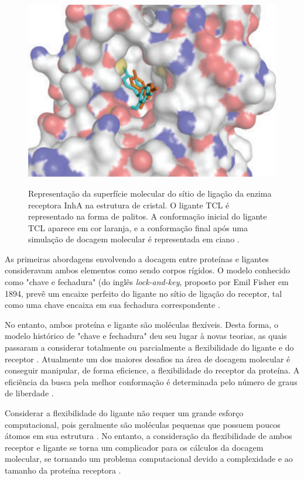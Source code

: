 \begin{figure}[h]
	\center
	\includegraphics[width=14cm]{images/TCLdocking.png}
	\label{fig:TCLdocking}
	\caption{Representação da superfície molecular do sítio de ligação da enzima receptora InhA na estrutura de cristal. O ligante TCL é  representado na forma de palitos. A conformação inicial do ligante TCL aparece em cor laranja, e a conformação final após uma simulação de docagem molecular é representada em ciano \cite{REN13}.}
\end{figure}

As primeiras abordagens envolvendo a docagem entre proteínas e ligantes consideravam ambos elementos como sendo corpos rígidos. O modelo conhecido como "chave e fechadura" (do inglês \emph{lock-and-key}, proposto por Emil Fisher em 1894, prevê um encaixe perfeito do ligante no sítio de ligação do receptor, tal como uma chave encaixa em sua fechadura correspondente \cite{kar07}. 

No entanto, ambos proteína e ligante são moléculas flexíveis. Desta forma, o modelo histórico de "chave e fechadura" deu seu lugar à novas teorias, as quais passaram a considerar totalmente ou parcialmente a flexibilidade do ligante e do receptor \cite{SOU06}. Atualmente um dos maiores desafios na área de docagem molecular é conseguir manipular, de forma eficience, a flexibilidade do receptor da proteína. A eficiência da busca pela melhor conformação é determinada pelo número de graus de liberdade  \cite{SOU06}. 

Considerar a flexibilidade do ligante não requer um grande esforço computacional, pois geralmente são moléculas pequenas que possuem poucos átomos em sua estrutura \cite{COH10}. No entanto, a consideração da flexibilidade de ambos receptor e ligante se torna um complicador para os cálculos da docagem molecular, se tornando um problema computacional devido a complexidade e ao tamanho da proteína receptora \cite{art08}.

